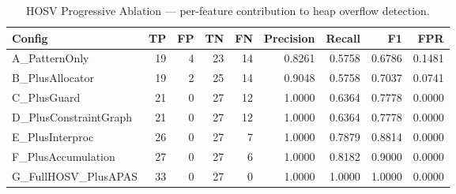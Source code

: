 \begin{table}[t]
\centering
\caption{HOSV Progressive Ablation — per-feature contribution to heap overflow detection.}
\label{tab:hosv_ablation}
\begin{tabular}{lrrrrrrrr}
\toprule
Config & TP & FP & TN & FN & Precision & Recall & F1 & FPR \\
\midrule
  A_PatternOnly & 19 & 4 & 23 & 14 & 0.8261 & 0.5758 & 0.6786 & 0.1481 \\
  B_PlusAllocator & 19 & 2 & 25 & 14 & 0.9048 & 0.5758 & 0.7037 & 0.0741 \\
  C_PlusGuard & 21 & 0 & 27 & 12 & 1.0000 & 0.6364 & 0.7778 & 0.0000 \\
  D_PlusConstraintGraph & 21 & 0 & 27 & 12 & 1.0000 & 0.6364 & 0.7778 & 0.0000 \\
  E_PlusInterproc & 26 & 0 & 27 & 7 & 1.0000 & 0.7879 & 0.8814 & 0.0000 \\
  F_PlusAccumulation & 27 & 0 & 27 & 6 & 1.0000 & 0.8182 & 0.9000 & 0.0000 \\
  G_FullHOSV_PlusAPAS & 33 & 0 & 27 & 0 & 1.0000 & 1.0000 & 1.0000 & 0.0000 \\
\bottomrule
\end{tabular}
\end{table}